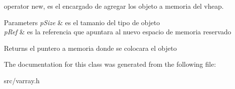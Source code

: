 operator new, es el encargado de agregar los objeto a memoria del vheap. 


\begin{DoxyParams}{Parameters}
{\em p\-Size} & es el tamanio del tipo de objeto \\
\hline
{\em p\-Ref} & es la referencia que apuntara al nuevo espacio de memoria reservado \\
\hline
\end{DoxyParams}
\begin{DoxyReturn}{Returns}
el puntero a memoria donde se colocara el objeto 
\end{DoxyReturn}


The documentation for this class was generated from the following file\-:\begin{DoxyCompactItemize}
\item 
src/varray.\-h\end{DoxyCompactItemize}
